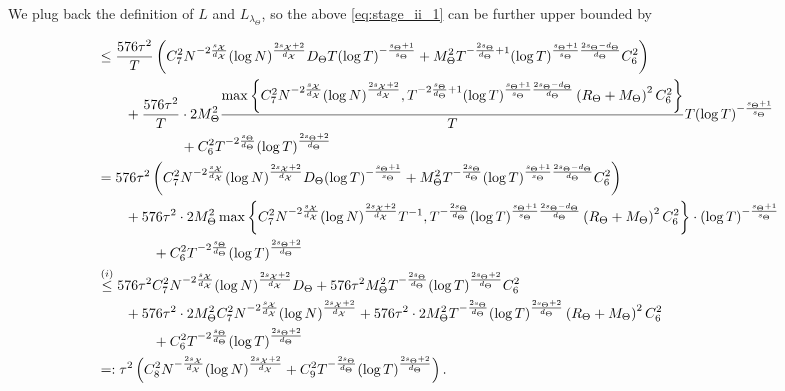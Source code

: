 We plug back the definition of $L$ and $L_{\lambda_\Theta}$, so the above \eqref{eq:stage_ii_1} can be further upper bounded by 
\begin{small}
\begin{align*}
    &\leq \frac{576 \tau^2}{T} \left( C_7^2 N^{- 2 \frac{s_{\mathcal{X}}}{d_{\mathcal{X}}}} (\log N)^{\frac{2s_{\mathcal{X}}+2}{d_{\mathcal{X}}}} D_\Theta T (\log T)^{-\frac{s_\Theta+1}{s_\Theta}} + M_\Theta^2 T^{- \frac{ 2 s_\Theta}{d_\Theta} + 1} (\log T)^{\frac{s_\Theta+1}{s_\Theta} \frac{2s_\Theta-d_\Theta}{d_\Theta}} C_6^2 \right) \\
    &\quad\quad + \frac{576 \tau^2}{T} \cdot 2 M_\Theta^2 \frac{\max \left \{ C_7^2 N^{-2 \frac{s_{\mathcal{X}}}{d_{\mathcal{X}}}} (\log N)^{\frac{2s_{\mathcal{X}}+2}{d_{\mathcal{X}}}} , T^{-2 \frac{s_\Theta}{d_\Theta} + 1} (\log T)^{\frac{s_\Theta+1}{s_\Theta} \frac{2s_\Theta-d_\Theta}{d_\Theta}}  \left( R_\Theta + M_\Theta\right)^2 C_6^2 \right\}}{T} T (\log T)^{-\frac{s_\Theta+1}{s_\Theta}} \\
    &\qquad\qquad\qquad + C_6^2  T^{- 2 \frac{ s_\Theta}{d_\Theta}} (\log T)^{\frac{2s_\Theta+2}{d_\Theta}} \\
    &= 576 \tau^2 \left( C_7^2 N^{- 2 \frac{s_{\mathcal{X}}}{d_{\mathcal{X}}}} (\log N)^{\frac{2s_{\mathcal{X}}+2}{d_{\mathcal{X}}}} D_\Theta (\log T)^{-\frac{s_\Theta+1}{s_\Theta}} + M_\Theta^2 T^{- \frac{ 2 s_\Theta}{d_\Theta}} (\log T)^{\frac{s_\Theta+1}{s_\Theta} \frac{2s_\Theta-d_\Theta}{d_\Theta}} C_6^2 \right) \\
    &\quad\quad + 576 \tau^2 \cdot 2 M_\Theta^2 \max \left \{ C_7^2 N^{-2 \frac{s_{\mathcal{X}}}{d_{\mathcal{X}}}} (\log N)^{\frac{2s_{\mathcal{X}}+2}{d_{\mathcal{X}}}} T^{-1}, T^{-\frac{2s_\Theta}{d_\Theta}} (\log T)^{\frac{s_\Theta+1}{s_\Theta} \frac{2s_\Theta-d_\Theta}{d_\Theta}} \left( R_\Theta + M_\Theta\right)^2  C_6^2 \right\} \cdot (\log T)^{-\frac{s_\Theta+1}{s_\Theta}} \\
    &\qquad\qquad+ C_6^2  T^{- 2 \frac{ s_\Theta}{d_\Theta}} (\log T)^{\frac{2s_\Theta+2}{d_\Theta}} \\
    &\stackrel{(i)}{\leq} 576 \tau^2 C_7^2 N^{- 2 \frac{s_{\mathcal{X}}}{d_{\mathcal{X}}}} (\log N)^{\frac{2s_{\mathcal{X}}+2}{d_{\mathcal{X}}}} D_\Theta + 576 \tau^2 M_\Theta^2 T^{- \frac{ 2 s_\Theta}{d_\Theta}} (\log T)^{\frac{2s_\Theta+2}{d_\Theta}} C_6^2 \\
    &\quad\quad + 576 \tau^2 \cdot 2 M_\Theta^2 C_7^2 N^{-2 \frac{s_{\mathcal{X}}}{d_{\mathcal{X}}}} (\log N)^{\frac{2s_{\mathcal{X}}+2}{d_{\mathcal{X}}}} + 576 \tau^2 \cdot 2 M_\Theta^2 T^{-\frac{2s_\Theta}{d_\Theta}} (\log T)^{\frac{2s_\Theta+2}{d_\Theta}} \left( R_\Theta + M_\Theta\right)^2  C_6^2 \\
    &\qquad\qquad + C_6^2  T^{- 2 \frac{ s_\Theta}{d_\Theta}} (\log T)^{\frac{2s_\Theta+2}{d_\Theta}}\\
    &=: \tau^2 \left( C_8^2 N^{- \frac{ 2 s_{\mathcal{X}}}{d_{\mathcal{X}}}} (\log N)^{\frac{2s_{\mathcal{X}}+2}{d_{\mathcal{X}}}} + C_9^2 T^{- \frac{ 2 s_\Theta}{d_\Theta}} (\log T)^{\frac{2s_\Theta+2}{d_\Theta}} \right).
\end{align*}
\end{small}
